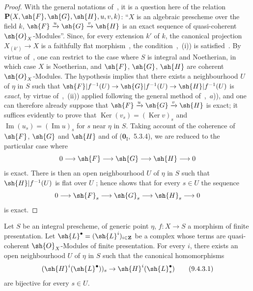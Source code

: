 \begin{proof}
With the general notations of~, it is a question here of the relation $\mathbf{P}(X,\sh{F},\sh{G},\sh{H},u,v,k)$: ``$X$ is an algebraic prescheme over the field $k$, $\sh{F}\xrightarrow{u}\sh{G}\xrightarrow{v}\sh{H}$ is an exact sequence of quasi-coherent $\sh{O}_X$-Modules''.
Since, for every extension $k'$ of $k$, the canonical projection $X_{(k')}\to X$ is a faithfully flat morphism~, the condition~,~(i)) is satisfied~.
By virtue of~, one can restrict to the case where $S$ is integral and Noetherian, in which case $X$ is Noetherian, and $\sh{F}$, $\sh{G}$, $\sh{H}$ are coherent $\sh{O}_X$-Modules.
The hypothesis implies that there exists a neighbourhood $U$ of $\eta$ in $S$ such that $\sh{F}|f^{-1}(U)\to\sh{G}|f^{-1}(U)\to\sh{H}|f^{-1}(U)$ is \emph{exact}, by virtue of~,~(ii)) applied following the general method of~,~$a$)), and one can therefore already suppose that $\sh{F}\xrightarrow{u}\sh{G}\xrightarrow{v}\sh{H}$ is exact; it suffices evidently to prove that $\operatorname{Ker}(v_s)=(\operatorname{Ker} v)_s$ and $\operatorname{Im}(u_s)=(\operatorname{Im} u)_s$ for $s$ near $\eta$ in $S$.
Taking account of the coherence of $\sh{F}$, $\sh{G}$ and $\sh{H}$ and of
($\mathbf{0}_{\mathrm{I}}$,~5.3.4), we are reduced to the particular case where
\[
 0\longrightarrow\sh{F}\longrightarrow\sh{G}\longrightarrow\sh{H}
 \longrightarrow0
\]
is exact.
There is then an open neighbourhood $U$ of $\eta$ in $S$ such that
$\sh{H}|f^{-1}(U)$ is flat over $U$ ; hence 
shows that for every $s\in U$ the sequence
\[
 0\longrightarrow\sh{F}_s\longrightarrow\sh{G}_s\longrightarrow\sh{H}_s
 \longrightarrow0
\]
is exact.
\end{proof}

\begin{corollary}[9.4.3]
\label{IV.9.4.3}
Let $S$ be an integral prescheme, of generic point $\eta$, $f:X\to S$ a morphism of finite presentation.
Let $\sh{L}^\bullet=(\sh{L}^i)_{i\in\mathbf{Z}}$ be a complex whose terms are quasi-coherent $\sh{O}_X$-Modules of finite presentation.
For every $i$, there exists an open neighbourhood $U$ of $\eta$ in $S$ such that the canonical homomorphisms
\begin{equation}
\label{IV.9.4.3.1}
  (\sh{H}^i(\sh{L}^\bullet))_s\to\sh{H}^i(\sh{L}^\bullet_s) \tag{9.4.3.1}
\end{equation}
are bijective for every $s\in U$.
\end{corollary}

